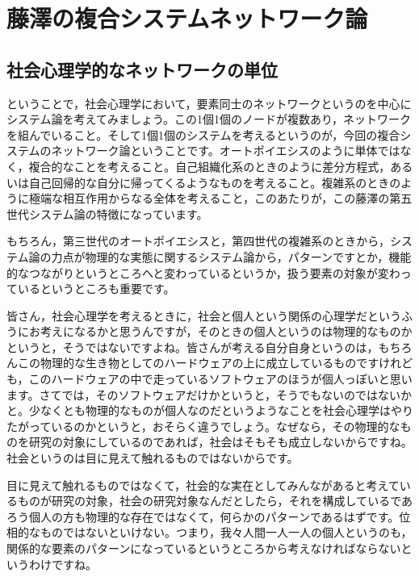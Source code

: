 \documentclass{ltjsbook}
\begin{document}
\section{ 藤澤の複合システムネットワーク論}

\subsection{社会心理学的なネットワークの単位}
ということで，社会心理学において，要素同士のネットワークというのを中心にシステム論を考えてみましょう。この1個1個のノードが複数あり，ネットワークを組んでいること。そして1個1個のシステムを考えるというのが，今回の複合システムのネットワーク論ということです。オートポイエシスのように単体ではなく，複合的なことを考えること。自己組織化系のときのように差分方程式，あるいは自己回帰的な自分に帰ってくるようなものを考えること。複雑系のときのように極端な相互作用からなる全体を考えること，このあたりが，この藤澤の第五世代システム論の特徴になっています。

もちろん，第三世代のオートポイエシスと，第四世代の複雑系のときから，システム論の力点が物理的な実態に関するシステム論から，パターンですとか，機能的なつながりというところへと変わっているというか，扱う要素の対象が変わっているというところも重要です。


皆さん，社会心理学を考えるときに，社会と個人という関係の心理学だというふうにお考えになるかと思うんですが，そのときの個人というのは物理的なものかというと，そうではないですよね。皆さんが考える自分自身というのは，もちろんこの物理的な生き物としてのハードウェアの上に成立しているものですけれども，このハードウェアの中で走っているソフトウェアのほうが個人っぽいと思います。さてでは，そのソフトウェアだけかというと，そうでもないのではないかと。少なくとも物理的なものが個人なのだというようなことを社会心理学はやりたがっているのかというと，おそらく違うでしょう。なぜなら，その物理的なものを研究の対象にしているのであれば，社会はそもそも成立しないからですね。社会というのは目に見えて触れるものではないからです。

目に見えて触れるものではなくて，社会的な実在としてみんながあると考えているものが研究の対象，社会の研究対象なんだとしたら，それを構成しているであろう個人の方も物理的な存在ではなくて，何らかのパターンであるはずです。位相的なものではないといけない。つまり，我々人間一人一人の個人というのも，関係的な要素のパターンになっているというところから考えなければならないというわけですね。
\end{document}

